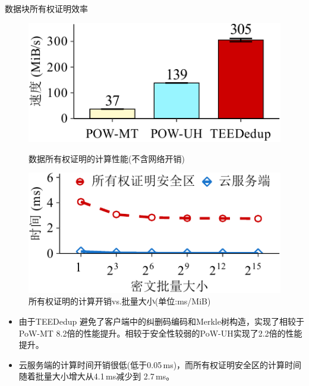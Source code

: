 \documentclass{beamer}
\newcommand{\sysnameS}{TEEDedup }
\begin{document}
\begin{frame}{数据块所有权证明效率}
    \begin{figure}[!htb]
        \begin{minipage}[t]{0.47\textwidth}
            \centering
            \includegraphics[width=\linewidth]{../pic/sgxdedup/plot/exp_a4/expa4_powPerformance.pdf}
            \caption{数据所有权证明的计算性能(不含网络开销)}
            \label{fig:sgxdedup-pow-comparison}
        \end{minipage}%
        \hspace{0.2in}
        \begin{minipage}[t]{0.47\textwidth}
            \centering
            \includegraphics[width=\linewidth]{../pic/sgxdedup/plot/exp_a4/expa4_powBatchSize_breakdown.pdf}
            \caption{所有权证明的计算开销vs.批量大小(单位:ms/MiB)}
            \label{fig:sgxdedup-multiClientThroughput}
        \end{minipage}%
    \end{figure}
    \begin{itemize}
        \item 由于\sysnameS 避免了客户端中的纠删码编码和Merkle树构造，实现了相较于PoW-MT 8.2倍的性能提升。相较于安全性较弱的PoW-UH实现了2.2倍的性能提升。
        \item 云服务端的计算时间开销很低(低于0.05\,ms)，而所有权证明安全区的计算时间随着批量大小增大从4.1\,ms减少到 2.7\,ms。
    \end{itemize}
\end{frame}
\end{document}

